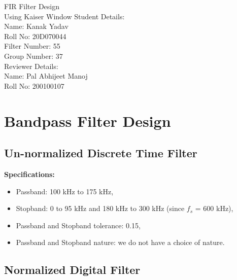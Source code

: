 \documentclass[12pt]{article}
\begin{document}
\begin{titlepage}
    \begin{center}
        \huge
        FIR Filter Design\\Using Kaiser Window
        \vfill
        \large
        Student Details:\\\vspace{3pt}
        Name: Kanak Yadav\\\vspace{3pt}
        Roll No: 20D070044\\\vspace{3pt}
        Filter Number: 55\\\vspace{3pt}
        Group Number: 37\\\vspace{60pt}
        Reviewer Details:\\\vspace{3pt}
        Name: Pal Abhijeet Manoj\\\vspace{3pt}
        Roll No: 200100107
        \vfill
    \end{center}
\end{titlepage}

\section{Bandpass Filter Design}
\subsection{Un-normalized Discrete Time Filter}
\hline
\vspace{10pt}
\textbf{Specifications:}
\begin{itemize}
    \item Passband: 100 kHz to 175 kHz,
    \item Stopband: 0 to 95 kHz and 180 kHz to 300 kHz (since $f_s$ = 600 kHz),
    \item Passband and Stopband tolerance: 0.15,
    \item Passband and Stopband nature: we do not have a choice of nature.
\end{itemize}
\hline

\subsection{Normalized Digital Filter}
\end{document}
